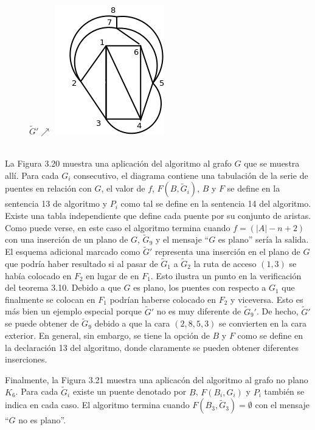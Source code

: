 \documentclass[10pt,a5paper]{book}
\begin{document}
\begin{figure}[H]
$\widetilde{G}' \nearrow$ \includegraphics[scale=.35]{Fig3_20_k.png}
\end{figure}
\hrulefill{}\\

La Figura 3.20 muestra una aplicación del algoritmo al grafo $G$ que se muestra allí. Para cada $G_i$ consecutivo, el diagrama contiene una tabulación de la serie de puentes en relación con $G$, el valor de $f$, $F(B,\widetilde{G}_i)$, $B$ y $F$ se define en la sentencia 13 de algoritmo y $P_i$ como tal se define en la sentencia 14 del algoritmo. Existe una tabla independiente que define cada puente por su conjunto de aristas. Como puede verse, en este caso el algoritmo termina cuando $f = (|A| -n+2)$ con una inserción de un plano de $G$, $\widetilde{G}_9$ y el mensaje ``$G$ es plano'' sería la salida. El esquema adicional marcado como $\widetilde{G}'$ representa una inserción en el plano de $G$ que podría haber resultado si al pasar de $\widetilde{G}_1$ a $\widetilde{G}_2$ la ruta de acceso $(1,3)$ se había colocado en $F_2$ en lugar de en $F_1$. Esto ilustra un punto en la verificación del teorema 3.10. Debido a que $G$ es plano, los puentes con respecto a $G_1$ que finalmente se colocan en $F_1$ podrían haberse colocado en $F_2$ y viceversa. Esto es más bien un ejemplo especial porque $\widetilde{G}'$ no es muy diferente de $\widetilde{G}_9'$. De hecho, $\widetilde{G}'$ se puede obtener de $\widetilde{G}_9$ debido a que la cara $(2, 8, 5, 3)$ se convierten en la cara exterior. En general, sin embargo, se tiene la opción de $B$ y $F$ como se define en la declaración 13 del algoritmo, donde claramente se pueden obtener diferentes inserciones.

Finalmente, la Figura 3.21 muestra una aplicacón del algoritmo al grafo no plano $K_6$. Para cada $\widetilde{G}_i$ existe un puente denotado por $B$, $F(B_i,G_i)$ y $P_i$ también se indica en cada caso. El algoritmo termina cuando $F(B_3,\widetilde{G}_3) = \emptyset$ con el mensaje ``$G$ no es plano''.
\end{document}
